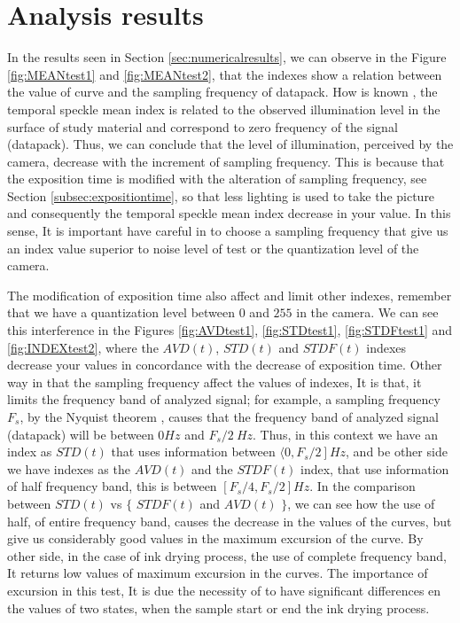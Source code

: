 \documentclass[review]{elsarticle}
\begin{document}
\section{Analysis results} 
\label{sec:analysisresults}


In the results seen in Section \ref{sec:numericalresults},
we can observe in the Figure \ref{fig:MEANtest1} and \ref{fig:MEANtest2}, 
that the indexes show a relation between the value of curve and the sampling frequency of datapack. 
How is known \cite{Nothdurft:05}, the temporal speckle mean index is related to 
the observed illumination level in the surface of study material and correspond to zero frequency of the signal (datapack).
Thus, we can conclude that the level of illumination, perceived by the camera, 
decrease with the increment of sampling frequency. 
This is because that the exposition time is modified with the alteration of sampling frequency, 
see Section \ref{subsec:expositiontime}, 
so that less lighting is used to take the picture and consequently the 
temporal speckle mean index decrease in  your value.
In this sense, It is important have careful in to choose a sampling frequency
that give us an index value superior to noise level of test or the quantization level of the camera.


The modification of exposition time also affect  and limit other indexes,
remember that we have a quantization level between $0$ and $255$ in the camera. 
We can see this interference in the Figures \ref{fig:AVDtest1}, \ref{fig:STDtest1}, \ref{fig:STDFtest1} and \ref{fig:INDEXtest2}, 
where the $AVD(t)$, $STD(t)$ and $STDF(t)$ indexes decrease your values in concordance with the decrease of exposition time.
Other way in that  the sampling frequency affect the values of indexes,
It is that, it limits the frequency band of analyzed signal; for example,
a sampling frequency $F_s$, by the Nyquist theorem \cite{Nyquist,Shannon}, 
causes that the frequency band of analyzed signal (datapack)  will be between $0 Hz$ and $F_s/2~Hz$.
Thus, in this context we have an index as $STD(t)$ that uses information between $\langle \left. 0, F_s/2 \right ] Hz$, 
and be other side we have indexes as the $AVD(t)$ and the $STDF(t)$ index, that use information of half frequency band, 
this is between $\left [ F_s/4, F_s/2 \right ] Hz$.
In the comparison between $STD(t)$ vs  $\{$ $STDF(t)$ and $AVD(t)$ $\}$, 
we can see how the use of half, of entire frequency band, causes the decrease in the values of the curves, 
but give us considerably good values in the maximum excursion of the curve. By other side,
in the case of ink drying process, the use of complete frequency band, 
It returns low values of maximum excursion in the curves. 
The importance of excursion in this test,
 It is due the necessity of to have significant differences en the values of two states,
when the sample start or end the ink drying process.
\end{document}

